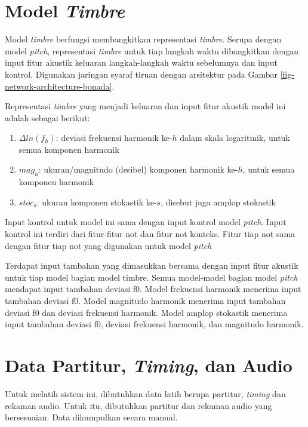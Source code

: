 \section{Model \textit{Timbre}}

Model \textit{timbre} berfungsi membangkitkan representasi \textit{timbre}. Serupa dengan model \textit{pitch}, representasi \textit{timbre} untuk tiap langkah waktu dibangkitkan dengan input fitur akustik keluaran langkah-langkah waktu sebelumnya dan input kontrol. Digunakan jaringan syaraf tiruan dengan arsitektur pada Gambar \ref{fig-network-architecture-bonada}.

Representasi \textit{timbre} yang menjadi keluaran dan input fitur akustik model ini adalah sebagai berikut:

\begin{enumerate}
    \item $\Delta ln(f_h)$: deviasi frekuensi harmonik ke-$h$ dalam skala logaritmik, untuk semua komponen harmonik
    \item $mag_h$: ukuran/magnitudo (desibel) komponen harmonik ke-$h$, untuk semua komponen harmonik
    \item $stoc_s$: ukuran komponen stokastik ke-$s$, disebut juga amplop stokastik
\end{enumerate}

Input kontrol untuk model ini sama dengan input kontrol model \textit{pitch}. Input kontrol ini terdiri dari fitur-fitur not dan fitur not konteks. Fitur tiap not sama dengan fitur tiap not yang digunakan untuk model \textit{pitch}

Terdapat input tambahan yang dimasukkan bersama dengan input fitur akustik untuk tiap model bagian model timbre. Semua model-model bagian model \textit{pitch} mendapat input tambahan deviasi f0. Model frekuensi harmonik menerima input tambahan deviasi f0. Model magnitudo harmonik menerima input tambahan deviasi f0 dan deviasi frekuensi harmonik. Model amplop stokastik menerima input tambahan deviasi f0, deviasi frekuensi harmonik, dan magnitudo harmonik.

\section{Data Partitur, \textit{Timing}, dan Audio} \label{datacollectionsection}

Untuk melatih sistem ini, dibutuhkan data latih berupa partitur, \textit{timing} dan rekaman audio. Untuk itu, dibutuhkan partitur dan rekaman audio yang bersesuaian. Data dikumpulkan secara manual.

